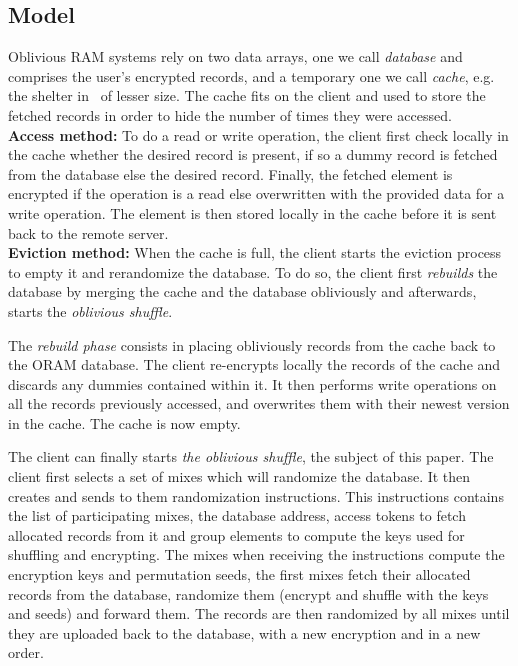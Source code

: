 \documentclass[USenglish,oneside,twocolumn]{article}
\begin{document}
\subsection{Model}\label{Model}

Oblivious RAM systems rely on two data arrays, one we call \emph{database} and comprises the user's encrypted records, and a temporary one we call \emph{cache}, e.g. the shelter in~\cite{goldreich87} of lesser size. The cache fits on the client and used to store the fetched records in order to hide the number of times they were accessed.\\

\noindent\textbf{Access method:} To do a read or write operation, the client first check locally in the cache whether the desired record is present, if so a dummy record is fetched from the database else the desired record. Finally, the fetched element is encrypted if the operation is a read else overwritten with the provided data for a write operation. The element is then stored locally in the cache before it is sent back to the remote server.\\

\noindent\textbf{Eviction method:} When the cache is full, the client starts the eviction process to empty it and rerandomize the database. To do so, the client first \textit{rebuilds} the database by merging the cache and the database obliviously and afterwards, starts the \textit{oblivious shuffle}.

The \emph{rebuild phase} consists in placing obliviously records from the cache back to the ORAM database. The client re-encrypts locally the records of the cache and discards any dummies contained within it. It then performs write operations on all the records previously accessed, and overwrites them with their newest version in the cache. The cache is now empty.

The client can finally starts \emph{the oblivious shuffle}, the subject of this paper. The client first selects a set of mixes which will randomize the database. It then creates and sends to them randomization instructions. This instructions contains the list of participating mixes, the database address, access tokens to fetch allocated records from it and group elements to compute the keys used for shuffling and encrypting. The mixes when receiving the instructions compute the encryption keys and permutation seeds, the first mixes fetch their allocated records from the database, randomize them (encrypt and shuffle with the keys and seeds) and forward them. The records are then randomized by all mixes until they are uploaded back to the database, with a new encryption and in a new order.
\end{document}

